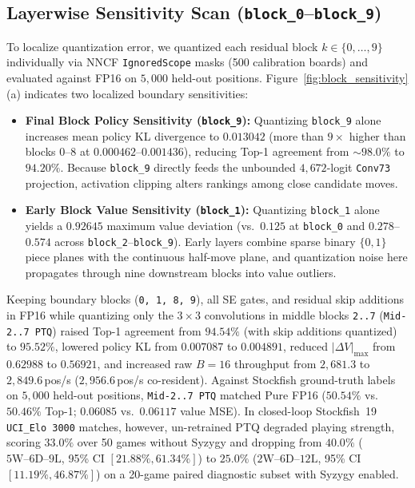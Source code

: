 \documentclass[10pt,twocolumn]{article}
\begin{document}
\subsection{Layerwise Sensitivity Scan (\texttt{block\_0}--\texttt{block\_9})}
To localize quantization error, we quantized each residual block $k \in \{0,\dots,9\}$ individually via NNCF \texttt{IgnoredScope} masks (500 calibration boards) and evaluated against FP16 on $5{,}000$ held-out positions. Figure~\ref{fig:block_sensitivity}(a) indicates two localized boundary sensitivities:
\begin{itemize}
  \item \textbf{Final Block Policy Sensitivity (\texttt{block\_9}):} Quantizing \texttt{block\_9} alone increases mean policy KL divergence to $0.013042$ (more than $9\times$ higher than blocks $0\text{--}8$ at $0.000462$--$0.001436$), reducing Top-1 agreement from ${\sim}98.0\%$ to $94.20\%$. Because \texttt{block\_9} directly feeds the unbounded $4{,}672$-logit \texttt{Conv73} projection, activation clipping alters rankings among close candidate moves.
  \item \textbf{Early Block Value Sensitivity (\texttt{block\_1}):} Quantizing \texttt{block\_1} alone yields a $0.92645$ maximum value deviation (vs.\ $0.125$ at \texttt{block\_0} and $0.278$--$0.574$ across \texttt{block\_2}--\texttt{block\_9}). Early layers combine sparse binary $\{0,1\}$ piece planes with the continuous half-move plane, and quantization noise here propagates through nine downstream blocks into value outliers.
\end{itemize}

Keeping boundary blocks (\texttt{0, 1, 8, 9}), all SE gates, and residual skip additions in FP16 while quantizing only the $3\times 3$ convolutions in middle blocks \texttt{2..7} (\texttt{Mid-2..7 PTQ}) raised Top-1 agreement from $94.54\%$ (with skip additions quantized) to $95.52\%$, lowered policy KL from $0.007087$ to $0.004891$, reduced $|\Delta V|_{\max}$ from $0.62988$ to $0.56921$, and increased raw $B=16$ throughput from $2{,}681.3$ to $2{,}849.6$\,pos/s ($2{,}956.6$\,pos/s co-resident). Against Stockfish ground-truth labels on $5{,}000$ held-out positions, \texttt{Mid-2..7 PTQ} matched Pure FP16 ($50.54\%$ vs.\ $50.46\%$ Top-1; $0.06085$ vs.\ $0.06117$ value MSE). In closed-loop Stockfish~19 \texttt{UCI\_Elo 3000} matches, however, un-retrained PTQ degraded playing strength, scoring $33.0\%$ over 50 games without Syzygy and dropping from $40.0\%$ ($5\text{W}\text{--}6\text{D}\text{--}9\text{L}$, 95\% CI $[21.88\%, 61.34\%]$) to $25.0\%$ ($2\text{W}\text{--}6\text{D}\text{--}12\text{L}$, 95\% CI $[11.19\%, 46.87\%]$) on a 20-game paired diagnostic subset with Syzygy enabled.
\end{document}
